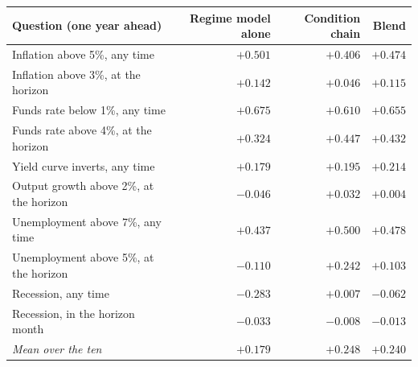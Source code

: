 \begin{tabular}{lrrr}
\toprule
Question (one year ahead) & Regime model alone & Condition chain & Blend \\
\midrule
Inflation above 5\%, any time & \textbf{$+0.501$} & $+0.406$ & $+0.474$ \\
Inflation above 3\%, at the horizon & \textbf{$+0.142$} & $+0.046$ & $+0.115$ \\
Funds rate below 1\%, any time & \textbf{$+0.675$} & $+0.610$ & $+0.655$ \\
Funds rate above 4\%, at the horizon & $+0.324$ & \textbf{$+0.447$} & $+0.432$ \\
Yield curve inverts, any time & $+0.179$ & $+0.195$ & \textbf{$+0.214$} \\
Output growth above 2\%, at the horizon & $-0.046$ & \textbf{$+0.032$} & $+0.004$ \\
Unemployment above 7\%, any time & $+0.437$ & \textbf{$+0.500$} & $+0.478$ \\
Unemployment above 5\%, at the horizon & $-0.110$ & \textbf{$+0.242$} & $+0.103$ \\
Recession, any time & $-0.283$ & \textbf{$+0.007$} & $-0.062$ \\
Recession, in the horizon month & $-0.033$ & \textbf{$-0.008$} & $-0.013$ \\
\emph{Mean over the ten} & $+0.179$ & $+0.248$ & $+0.240$ \\
\bottomrule
\end{tabular}
